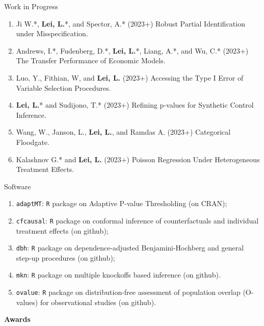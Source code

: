 \documentclass{article}
\begin{document}
\begin{large}
\noindent Work in Progress
\end{large}

\begin{enumerate}
\item Ji W.*, \textbf{Lei, L.}*, and Spector, A.* (2023+) Robust Partial Identification under Misspecification.
\item Andrews, I.*, Fudenberg, D.*, \textbf{Lei, L.}*, Liang, A.*, and Wu, C.* (2023+) The Transfer Performance of Economic Models.
\item Luo, Y., Fithian, W, and \textbf{Lei, L.} (2023+) Accessing the Type I Error of Variable Selection Procedures.
\item \textbf{Lei, L.}* and Sudijono, T.* (2023+) Refining p-values for Synthetic Control Inference.
\item Wang, W., Janson, L., \textbf{Lei, L.}, and Ramdas A. (2023+) Categorical Floodgate.
\item Kalashnov G.* and \textbf{Lei, L.} (2023+) Poisson Regression Under Heterogeneous Treatment Effects.
\end{enumerate}

\begin{large}
\noindent Software
\end{large}

\begin{enumerate}
\item \texttt{adaptMT}: \texttt{R} package on Adaptive P-value Thresholding (on CRAN);
\item \texttt{cfcausal}: \texttt{R} package on conformal inference of counterfactuals and individual treatment effects (on github);
\item \texttt{dbh}: \texttt{R} package on dependence-adjusted Benjamini-Hochberg and general step-up procedures (on github);
\item \texttt{mkn}: \texttt{R} package on multiple knockoffs based inference (on github).
\item \texttt{ovalue}: \texttt{R} package on distribution-free assessment of population overlap (O-values) for observational studies (on github).
\end{enumerate}

\vspace{3mm}
\begin{large}
\noindent \textbf{Awards}
\end{large}

\vspace{5mm}
\end{document}
